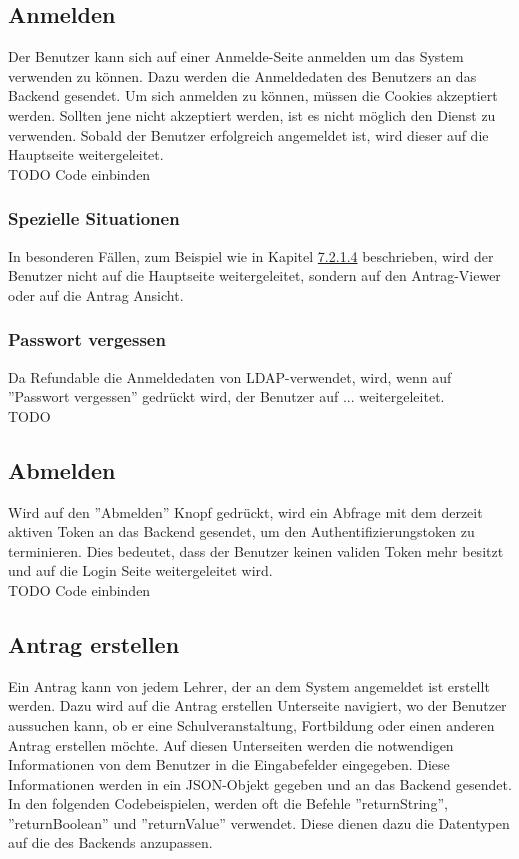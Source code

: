 \subsection{Anmelden}
Der Benutzer kann sich auf einer Anmelde-Seite anmelden um das System verwenden zu können. Dazu werden die Anmeldedaten des Benutzers an das Backend gesendet. Um sich anmelden zu können, müssen die Cookies akzeptiert werden. Sollten jene nicht akzeptiert werden, ist es nicht möglich den Dienst zu verwenden.
Sobald der Benutzer erfolgreich angemeldet ist, wird dieser auf die Hauptseite weitergeleitet.
\\
TODO Code einbinden
\subsubsection{Spezielle Situationen}
In besonderen Fällen, zum Beispiel wie in Kapitel \hyperref[sec:antrag_viewer]{7.2.1.4} beschrieben, wird der Benutzer nicht auf die Hauptseite weitergeleitet, sondern auf den Antrag-Viewer oder auf die Antrag Ansicht.
\subsubsection{Passwort vergessen}
Da Refundable die Anmeldedaten von LDAP-verwendet, wird, wenn auf ''Passwort vergessen'' gedrückt wird, der Benutzer auf ... weitergeleitet.
\\
TODO
\subsection{Abmelden}
Wird auf den ''Abmelden'' Knopf gedrückt, wird ein Abfrage mit dem derzeit aktiven Token an das Backend gesendet, um den Authentifizierungstoken zu terminieren. Dies bedeutet, dass der Benutzer keinen validen Token mehr besitzt und auf die Login Seite weitergeleitet wird.
\\
TODO Code einbinden
\newpage
\subsection{Antrag erstellen}
Ein Antrag kann von jedem Lehrer, der an dem System angemeldet ist erstellt werden. Dazu wird auf die Antrag erstellen Unterseite navigiert, wo der Benutzer aussuchen kann, ob er eine Schulveranstaltung, Fortbildung oder einen anderen Antrag erstellen möchte. Auf diesen Unterseiten werden die notwendigen Informationen von dem Benutzer in die Eingabefelder eingegeben. Diese Informationen werden in ein JSON-Objekt gegeben und an das Backend gesendet.
\\
In den folgenden Codebeispielen, werden oft die Befehle ''returnString'', ''returnBoolean'' und ''returnValue'' verwendet. Diese dienen dazu die Datentypen auf die des Backends anzupassen. 
